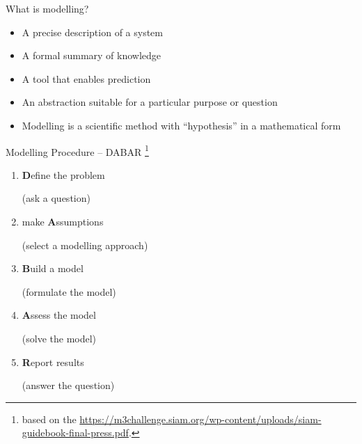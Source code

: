 \documentclass{workbook}
\begin{document}
\begin{slide}

\question 

\begin{parts}
	\item What is modelling?
\end{parts}



\begin{solution}
	\begin{itemize}
		\item A precise description of a system
		\item A formal summary of knowledge
		\item A tool that enables prediction
		\item An abstraction suitable for a particular purpose or question
		\item Modelling is a scientific method with ``hypothesis'' in a mathematical form	
	\end{itemize}	
\end{solution}
	
\end{slide}




\begin{slide}
\begin{parts}
\setcounter{partsitem}{1}
	\item Modelling Procedure -- DABAR \footnote{based on the \href{SIAM $M^2 (GS)^2$ Textbook}{https://m3challenge.siam.org/wp-content/uploads/siam-guidebook-final-press.pdf}.}
	
	\begin{enumerate}
		\item[\it Step 1.] \textbf{\large D}efine the problem 
			\begin{solution}\hfill (ask a question)\end{solution}

		\item[\it Step 2.] make \textbf{\large A}ssumptions 
			\begin{solution}\hfill (select a modelling approach)\end{solution}

		\item[\it Step 3.] \textbf{\large B}uild a model
			\begin{solution} \hfill (formulate the model)\end{solution}

		\item[\it Step 4.] \textbf{\large A}ssess the model 
			\begin{solution} \hfill (solve the model) \end{solution}

		\item[\it Step 5.] \textbf{\large R}eport results
			\begin{solution} \hfill (answer the question) \end{solution}
	\end{enumerate}	
\end{parts}

	
\end{slide}
\end{document}
